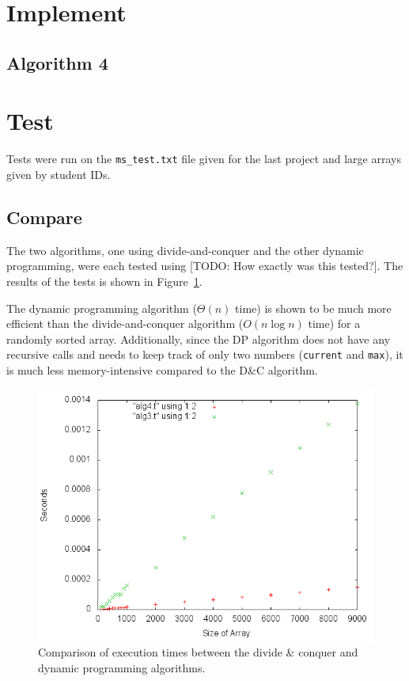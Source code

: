 \documentclass[a4paper,10pt]{article}
\begin{document}
	\section{Implement}
		\subsection{Algorithm 4}
		


	\section{Test}
		Tests were run on the {\tt ms\_test.txt} file given for the last project and large arrays given by student IDs.


\begin{samepage} 
	\section{Compare}
		The two algorithms, one using divide-and-conquer and the other dynamic programming, were each tested using [TODO: How exactly was this tested?]. The results of the tests is shown in Figure~\ref{fig:algcomp}.

		The dynamic programming algorithm ($\Theta(n)$ time) is shown to be much more efficient than the divide-and-conquer algorithm ($O(n \log n)$ time) for a randomly sorted array. Additionally, since the DP algorithm does not have any recursive calls and needs to keep track of only two numbers ({\tt current} and {\tt max}), it is much less memory-intensive compared to the D\&C algorithm.

		\begin{figure}[!htb]
			\centering
			\includegraphics[scale=.5]{timingfiles/algCompareplot.png}
			\caption{Comparison of execution times between the divide \& conquer and dynamic programming algorithms.}
			\label{fig:algcomp}
		\end{figure}
\end{samepage} 

		
		
\end{document}
